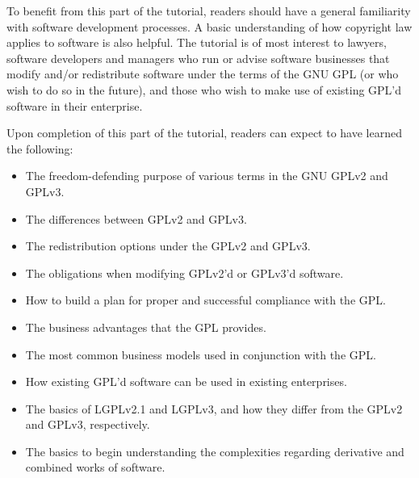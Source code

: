 To benefit from this part of the tutorial, readers should
have a general familiarity with software development processes.  A basic
understanding of how copyright law applies to software is also helpful.  The
tutorial is of most interest to lawyers, software developers and managers who
run or advise software businesses that modify and/or redistribute software
under the terms of the GNU GPL (or who wish to do so in the future), and those
who wish to make use of existing GPL'd software in their enterprise.

Upon completion of this part of the tutorial, readers can expect
to have learned the following:

\begin{itemize}

  \item The freedom-defending purpose of various terms in the GNU GPLv2 and GPLv3.

  \item The differences between GPLv2 and GPLv3.

  \item The redistribution options under the GPLv2 and GPLv3.

  \item The obligations when modifying GPLv2'd or GPLv3'd software.

  \item How to build a plan for proper and successful compliance with the GPL.

  \item The business advantages that the GPL provides.

  \item The most common business models used in conjunction with the GPL.

  \item How existing GPL'd software can be used in existing enterprises.

  \item The basics of LGPLv2.1 and LGPLv3, and how they
    differ from the GPLv2 and GPLv3, respectively.

  \item The basics to begin understanding the complexities regarding
    derivative and combined works of software.
\end{itemize}


